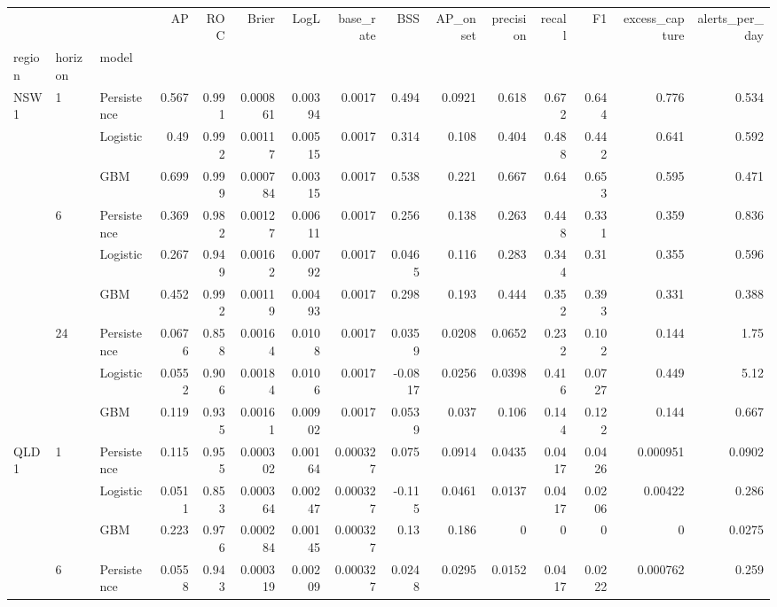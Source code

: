 \begin{tabular}{lllrrrrrrrrrrrr}
\toprule
 &  &  & AP & ROC & Brier & LogL & base_rate & BSS & AP_onset & precision & recall & F1 & excess_capture & alerts_per_day \\
region & horizon & model &  &  &  &  &  &  &  &  &  &  &  &  \\
\midrule
\multirow[t]{9}{*}{NSW1} & \multirow[t]{3}{*}{1} & Persistence & 0.567 & 0.991 & 0.000861 & 0.00394 & 0.0017 & 0.494 & 0.0921 & 0.618 & 0.672 & 0.644 & 0.776 & 0.534 \\
 &  & Logistic & 0.49 & 0.992 & 0.00117 & 0.00515 & 0.0017 & 0.314 & 0.108 & 0.404 & 0.488 & 0.442 & 0.641 & 0.592 \\
 &  & GBM & 0.699 & 0.999 & 0.000784 & 0.00315 & 0.0017 & 0.538 & 0.221 & 0.667 & 0.64 & 0.653 & 0.595 & 0.471 \\
\cline{2-15}
 & \multirow[t]{3}{*}{6} & Persistence & 0.369 & 0.982 & 0.00127 & 0.00611 & 0.0017 & 0.256 & 0.138 & 0.263 & 0.448 & 0.331 & 0.359 & 0.836 \\
 &  & Logistic & 0.267 & 0.949 & 0.00162 & 0.00792 & 0.0017 & 0.0465 & 0.116 & 0.283 & 0.344 & 0.31 & 0.355 & 0.596 \\
 &  & GBM & 0.452 & 0.992 & 0.00119 & 0.00493 & 0.0017 & 0.298 & 0.193 & 0.444 & 0.352 & 0.393 & 0.331 & 0.388 \\
\cline{2-15}
 & \multirow[t]{3}{*}{24} & Persistence & 0.0676 & 0.858 & 0.00164 & 0.0108 & 0.0017 & 0.0359 & 0.0208 & 0.0652 & 0.232 & 0.102 & 0.144 & 1.75 \\
 &  & Logistic & 0.0552 & 0.906 & 0.00184 & 0.0106 & 0.0017 & -0.0817 & 0.0256 & 0.0398 & 0.416 & 0.0727 & 0.449 & 5.12 \\
 &  & GBM & 0.119 & 0.935 & 0.00161 & 0.00902 & 0.0017 & 0.0539 & 0.037 & 0.106 & 0.144 & 0.122 & 0.144 & 0.667 \\
\cline{1-15} \cline{2-15}
\multirow[t]{9}{*}{QLD1} & \multirow[t]{3}{*}{1} & Persistence & 0.115 & 0.955 & 0.000302 & 0.00164 & 0.000327 & 0.075 & 0.0914 & 0.0435 & 0.0417 & 0.0426 & 0.000951 & 0.0902 \\
 &  & Logistic & 0.0511 & 0.853 & 0.000364 & 0.00247 & 0.000327 & -0.115 & 0.0461 & 0.0137 & 0.0417 & 0.0206 & 0.00422 & 0.286 \\
 &  & GBM & 0.223 & 0.976 & 0.000284 & 0.00145 & 0.000327 & 0.13 & 0.186 & 0 & 0 & 0 & 0 & 0.0275 \\
\cline{2-15}
 & \multirow[t]{3}{*}{6} & Persistence & 0.0558 & 0.943 & 0.000319 & 0.00209 & 0.000327 & 0.0248 & 0.0295 & 0.0152 & 0.0417 & 0.0222 & 0.000762 & 0.259 \\

\end{tabular}
